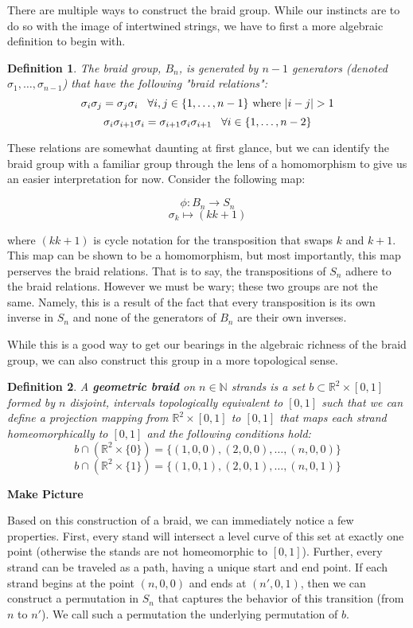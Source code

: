 \documentclass[10pt]{ucthesis}
\newcommand{\R}{\mathbb{R}}
\newcommand{\N}{\mathbb{N}}
\newtheorem{definition}{Definition}[chapter]
\begin{document}
There are multiple ways to construct the braid group. While our instincts are to do so with the image of intertwined strings, we have to first a more algebraic definition to begin with.

\begin{definition}
	The braid group, $B_n$, is generated by $n-1$ generators (denoted $\sigma_1,\hdots,\sigma_{n-1}$) that have the following "braid relations":
$$\sigma_i\sigma_j = \sigma_j\sigma_i \hspace{3mm} \forall i,j \in \{1,\hdots,n-1\} \text{ where } |i-j|>1$$
$$\sigma_i\sigma_{i+1}\sigma_i=\sigma_{i+1}\sigma_i\sigma_{i+1} \hspace{3mm} \forall i \in \{1,\hdots,n-2\}$$
\end{definition}

These relations are somewhat daunting at first glance, but we can identify the braid group with a familiar group through the lens of a homomorphism to give us an easier interpretation for now. Consider the following map:

$$\phi:B_n\rightarrow S_n$$
$$\sigma_k \mapsto (k k+1)$$

where $(k k+1)$ is cycle notation for the transposition that swaps $k$ and $k+1$. This map can be shown to be a homomorphism, but most importantly, this map perserves the braid relations. That is to say, the transpositions of $S_n$ adhere to the braid relations. However we must be wary; these two groups are not the same. Namely, this is a result of the fact that every transposition is its own inverse in $S_n$ and none of the generators of $B_n$ are their own inverses. 

While this is a good way to get our bearings in the algebraic richness of the braid group, we can also construct this group in a more topological sense.

\begin{definition}
	A \textbf{geometric braid} on $n\in \N$ strands is a set $b\subset\R^2\times [0,1]$ formed by $n$ disjoint, intervals topologically equivalent to $[0,1]$ such that we can define a projection mapping from $\R^2\times [0,1]$ to $[0,1]$ that maps each strand homeomorphically to $[0,1]$ and the following conditions hold:
$$b\cap(\R^2\times\{0\}) = \{(1,0,0),(2,0,0),\hdots,(n,0,0)\}$$
$$b\cap(\R^2\times\{1\}) = \{(1,0,1),(2,0,1),\hdots,(n,0,1)\}$$
\end{definition}

\textbf{Make Picture}

Based on this construction of a braid, we can immediately notice a few properties. First, every stand will intersect a level curve of this set at exactly one point (otherwise the stands are not homeomorphic to $[0,1]$). Further, every strand can be traveled as a path, having a unique start and end point. If each strand begins at the point $(n,0,0)$ and ends at $(n',0,1)$, then we can construct a permutation in $S_n$ that captures the behavior of this transition (from $n$ to $n'$). We call such a permutation the underlying permutation of $b$.
\end{document}
